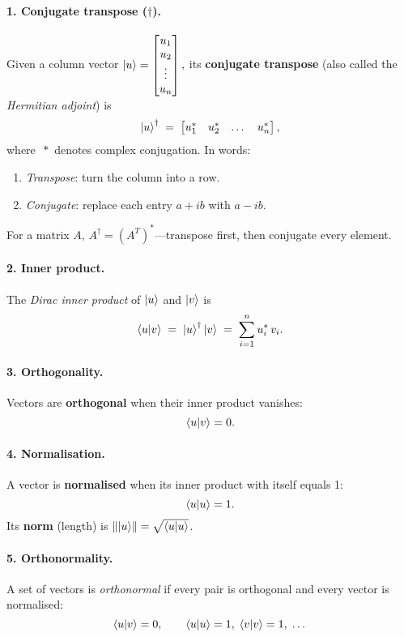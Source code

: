 \documentclass[12pt]{article}
\begin{document}
\paragraph{1. Conjugate transpose (\texorpdfstring{$\dagger$}{†}).}
Given a column vector
$
  \ket{u}=\begin{bmatrix}u_{1}\\u_{2}\\\vdots\\u_{n}\end{bmatrix},
$
its \textbf{conjugate transpose} (also called the
\emph{Hermitian adjoint}) is
\[
   \ket{u}^{\dagger}
   \;=\;
   \begin{bmatrix}
     u_{1}^{*} & u_{2}^{*} & \dots & u_{n}^{*}
   \end{bmatrix},
\]
where \(\,*\) denotes complex conjugation.  In words:
\begin{enumerate}
  \item \emph{Transpose}: turn the column into a row.
  \item \emph{Conjugate}: replace each entry \(a+ib\) with \(a-ib\).
\end{enumerate}
For a matrix \(A\), \(A^{\dagger}=(A^{T})^{*}\)---transpose first, then
conjugate every element.

\paragraph{2. Inner product.}
The \emph{Dirac inner product} of \(\ket{u}\) and \(\ket{v}\) is
\[
   \braket{u}{v}
   \;=\;
   \ket{u}^{\dagger}\ket{v}
   \;=\;
   \sum_{i=1}^{n}u_{i}^{*}\,v_{i}.
\]

\paragraph{3. Orthogonality.}
Vectors are \textbf{orthogonal} when their inner product vanishes:
\[
   \braket{u}{v}=0.
\]

\paragraph{4. Normalisation.}
A vector is \textbf{normalised} when its inner product with itself
equals 1:
\[
   \braket{u}{u}=1.
\]
Its \textbf{norm} (length) is \(\norm{\ket{u}}=\sqrt{\braket{u}{u}}\).

\paragraph{5. Orthonormality.}
A set of vectors is \emph{orthonormal} if every pair is orthogonal and
every vector is normalised:
\[
   \braket{u}{v}=0,\qquad
   \braket{u}{u}=1,\;
   \braket{v}{v}=1,\;\dots
\]
\end{document}

